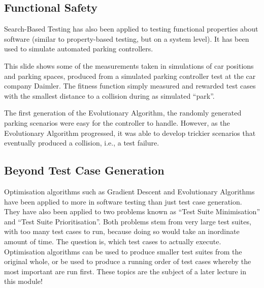 
\subsection{Functional Safety}

Search-Based Testing has also been applied to testing functional properties
about software (similar to property-based testing, but on a system level). It
has been used to simulate automated parking controllers. 



This slide shows some of the measurements taken in simulations of car positions
and parking spaces, produced from a simulated parking controller test at the car
company Daimler. The fitness function simply measured and rewarded test cases
with the smallest distance to a collision during as simulated ``park''. 


The first generation of the Evolutionary Algorithm, the randomly generated
parking scenarios were easy for the controller to handle. However, as the
Evolutionary Algorithm progressed, it was able to develop trickier scenarios
that eventually produced a collision, i.e., a test failure.



\subsection{Beyond Test Case Generation}

Optimisation algorithms such as Gradient Descent and Evolutionary Algorithms
have been applied to more in software testing than just test case generation.
They have also been applied to two problems known as ``Test Suite Minimisation''
and ``Test Suite Prioritisation''. Both problems stem from very large test
suites, with too many test cases to run, because doing so would take an
inordinate amount of time. The question is, which test cases to actually
execute. Optimisation algorithms can be used to produce smaller test suites from
the original whole, or be used to produce a running order of test cases whereby
the most important are run first. These topics are the subject of a later
lecture in this module!

